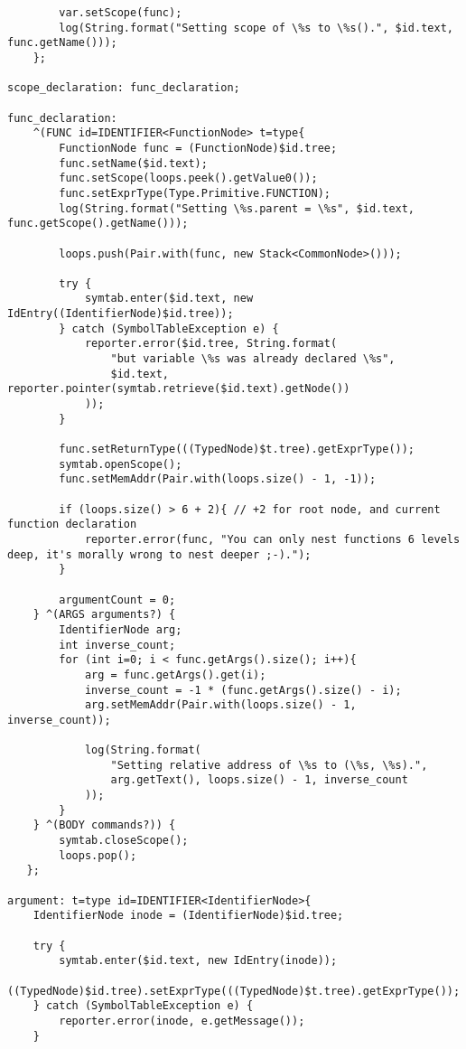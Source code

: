 \begin{landscape}
\begin{lstlisting}
        var.setScope(func);
        log(String.format("Setting scope of \%s to \%s().", $id.text, func.getName()));
    };

scope_declaration: func_declaration;

func_declaration:
    ^(FUNC id=IDENTIFIER<FunctionNode> t=type{
        FunctionNode func = (FunctionNode)$id.tree;
        func.setName($id.text);
        func.setScope(loops.peek().getValue0());
        func.setExprType(Type.Primitive.FUNCTION);
        log(String.format("Setting \%s.parent = \%s", $id.text, func.getScope().getName()));

        loops.push(Pair.with(func, new Stack<CommonNode>()));

        try {
            symtab.enter($id.text, new IdEntry((IdentifierNode)$id.tree));
        } catch (SymbolTableException e) {
            reporter.error($id.tree, String.format(
                "but variable \%s was already declared \%s",
                $id.text, reporter.pointer(symtab.retrieve($id.text).getNode())
            ));
        }

        func.setReturnType(((TypedNode)$t.tree).getExprType());
        symtab.openScope();
        func.setMemAddr(Pair.with(loops.size() - 1, -1));

        if (loops.size() > 6 + 2){ // +2 for root node, and current function declaration
            reporter.error(func, "You can only nest functions 6 levels deep, it's morally wrong to nest deeper ;-).");
        }

        argumentCount = 0;
    } ^(ARGS arguments?) {
        IdentifierNode arg;
        int inverse_count;
        for (int i=0; i < func.getArgs().size(); i++){
            arg = func.getArgs().get(i);
            inverse_count = -1 * (func.getArgs().size() - i);
            arg.setMemAddr(Pair.with(loops.size() - 1, inverse_count));

            log(String.format(
                "Setting relative address of \%s to (\%s, \%s).",
                arg.getText(), loops.size() - 1, inverse_count
            ));
        }
    } ^(BODY commands?)) {
        symtab.closeScope();
        loops.pop();
   };

argument: t=type id=IDENTIFIER<IdentifierNode>{
    IdentifierNode inode = (IdentifierNode)$id.tree;

    try {
        symtab.enter($id.text, new IdEntry(inode));
        ((TypedNode)$id.tree).setExprType(((TypedNode)$t.tree).getExprType());
    } catch (SymbolTableException e) {
        reporter.error(inode, e.getMessage());
    }


\end{lstlisting}
\end{landscape}
